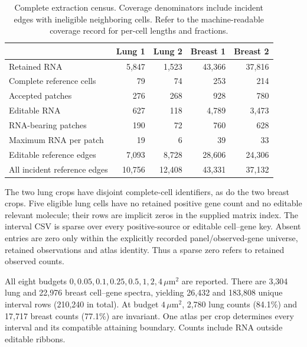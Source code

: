 \documentclass[10pt,letterpaper]{article}
\begin{document}
\begin{table}[ht]\centering
\begin{tabular}{lrrrr}\toprule
 &Lung 1&Lung 2&Breast 1&Breast 2\\\midrule
Retained RNA&5,847&1,523&43,366&37,816\\
Complete reference cells&79&74&253&214\\
Accepted patches&276&268&928&780\\
Editable RNA&627&118&4,789&3,473\\
RNA-bearing patches&190&72&760&628\\
Maximum RNA per patch&19&6&39&33\\
Editable reference edges&7,093&8,728&28,606&24,306\\
All incident reference edges&10,756&12,408&43,331&37,132\\\bottomrule
\end{tabular}
\caption{Complete extraction census. Coverage denominators include incident edges with ineligible neighboring cells. Refer to the machine-readable coverage record for per-cell lengths and fractions.}
\end{table}

The two lung crops have disjoint complete-cell identifiers, as do the two breast crops. Five eligible lung cells have no retained positive gene count and no editable relevant molecule; their rows are implicit zeros in the supplied matrix index. The interval CSV is sparse over every positive-source or editable cell--gene key. Absent entries are zero only within the explicitly recorded panel/observed-gene universe, retained observations and atlas identity. Thus a sparse zero refers to retained observed counts.

All eight budgets $0,0.05,0.1,0.25,0.5,1,2,4\,\mu\mathrm m^2$ are reported. There are 3,304 lung and 22,976 breast cell--gene spectra, yielding 26,432 and 183,808 unique interval rows (210,240 in total). At budget $4\,\mu\mathrm m^2$, 2,780 lung counts (84.1\%) and 17,717 breast counts (77.1\%) are invariant. One atlas per crop determines every interval and its compatible attaining boundary. Counts include RNA outside editable ribbons.
\end{document}
